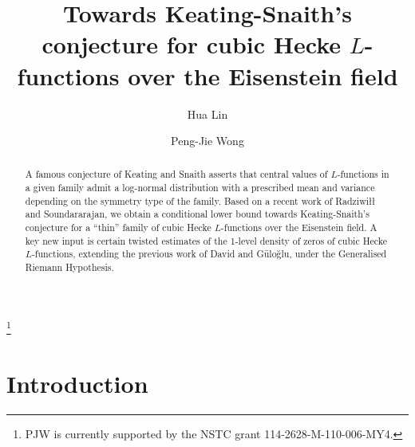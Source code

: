 \documentclass[11pt]{amsart}
\numberwithin{equation}{section}
\theoremstyle{remark}
\begin{document}
\title[Towards Keating-Snaith's conjecture for cubic Hecke $L$-functions]{Towards Keating-Snaith's conjecture for cubic Hecke $L$-functions over the Eisenstein field}


\author[H. Lin]{Hua Lin}
\address[Hua Lin]{Department of Mathematics\\
Northwestern University, Evanston, IL, USA}

\author[P.-J. Wong]{Peng-Jie Wong}
\address[Peng-Jie Wong]{Department of Applied Mathematics\\
National Sun Yat-Sen University\\
Kaohsiung City, Taiwan}








\keywords{}

\thanks{PJW is currently supported by the NSTC grant 114-2628-M-110-006-MY4.}

\begin{abstract}
    A famous conjecture of Keating and Snaith asserts that central values of $L$-functions in a given family admit a log-normal distribution with a prescribed mean and variance depending on the symmetry type of the family. Based on a recent work of {Radziwi\l\l} and Soundararajan, we obtain a conditional lower bound towards Keating-Snaith's conjecture for a ``thin'' family of cubic Hecke $L$-functions over the Eisenstein field. A key new input is certain twisted estimates of the 1-level density of zeros of cubic Hecke $L$-functions, extending the previous work of David and G\"{u}lo\u{g}lu, under the Generalised Riemann Hypothesis. 
\end{abstract}

\maketitle



\section{Introduction}
\end{document}
